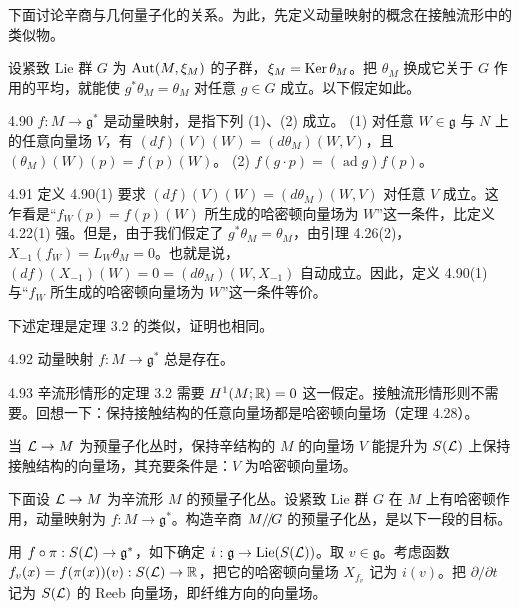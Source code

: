下面讨论辛商与几何量子化的关系。为此，先定义动量映射的概念在接触流形中的类似物。

设紧致 Lie 群 $G$ 为 $\operatorname{Aut}(M,\xi_M)$ 的子群，$\xi_M=\operatorname{Ker}\theta_M$。把 $\theta_M$ 换成它关于 $G$ 作用的平均，就能使 $g^*\theta_M=\theta_M$ 对任意 $g\in G$ 成立。以下假定如此。

\begin{definition}{4.90}
  $f:M\to\mathfrak{g}^*$ 是动量映射，是指下列 (1)、(2) 成立。
  (1) 对任意 $W\in\mathfrak{g}$ 与 $N$ 上的任意向量场 $V$，有 $(df)(V)(W)=(d\theta_M)(W,V)$，且 $(\theta_M)(W)(p)=f(p)(W)$。
  (2) $f(g\cdot p)=(\operatorname{ad}g)f(p)$。
\end{definition}

\begin{remark}{4.91}
  定义 4.90(1) 要求 $(df)(V)(W)=(d\theta_M)(W,V)$ 对任意 $V$ 成立。这乍看是“$f_W(p)=f(p)(W)$ 所生成的哈密顿向量场为 $W$”这一条件，比定义 4.22(1) 强。但是，由于我们假定了 $g^*\theta_M=\theta_M$，由引理 4.26(2)，$X_{-1}(f_W)=L_W\theta_M=0$。也就是说，$(df)(X_{-1})(W)=0=(d\theta_M)(W,X_{-1})$ 自动成立。因此，定义 4.90(1) 与“$f_W$ 所生成的哈密顿向量场为 $W$”这一条件等价。
\end{remark}

下述定理是定理 3.2 的类似，证明也相同。

\begin{theorem}{4.92}
  动量映射 $f:M\to\mathfrak{g}^*$ 总是存在。
\end{theorem}

\begin{remark}{4.93}
  辛流形情形的定理 3.2 需要 $H^1(M;\mathbb{R})=0$ 这一假定。接触流形情形则不需要。回想一下：保持接触结构的任意向量场都是哈密顿向量场（定理 4.28）。
\end{remark}

当 $\mathcal{L}\to M$ 为预量子化丛时，保持辛结构的 $M$ 的向量场 $V$ 能提升为 $S(\mathcal{L})$ 上保持接触结构的向量场，其充要条件是：$V$ 为哈密顿向量场。

下面设 $\mathcal{L}\to M$ 为辛流形 $M$ 的预量子化丛。设紧致 Lie 群 $G$ 在 $M$ 上有哈密顿作用，动量映射为 $f:M\to\mathfrak{g}^*$。构造辛商 ${M}/\!/\!{G}$ 的预量子化丛，是以下一段的目标。

用 $f\circ\pi:S(\mathcal{L})\to\mathfrak{g}^*$，如下确定 $i:\mathfrak{g}\to\operatorname{Lie}(S(\mathcal{L}))$。取 $v\in\mathfrak{g}$。考虑函数 $f_v(x)=f(\pi(x))(v):S(\mathcal{L})\to\mathbb{R}$，把它的哈密顿向量场 $X_{f_v}$ 记为 $i(v)$。把 $\partial/\partial t$ 记为 $S(\mathcal{L})$ 的 Reeb 向量场，即纤维方向的向量场。


